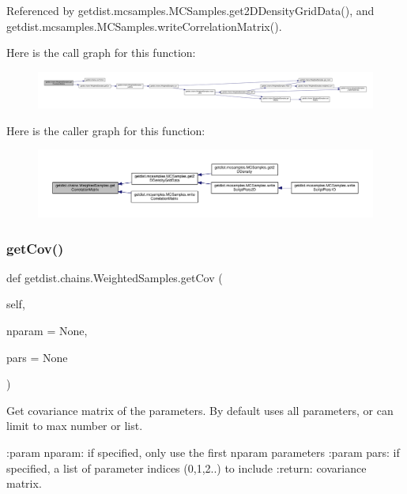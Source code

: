 Referenced by getdist.\+mcsamples.\+M\+C\+Samples.\+get2\+D\+Density\+Grid\+Data(), and getdist.\+mcsamples.\+M\+C\+Samples.\+write\+Correlation\+Matrix().

Here is the call graph for this function\+:
\nopagebreak
\begin{figure}[H]
\begin{center}
\leavevmode
\includegraphics[width=350pt]{classgetdist_1_1chains_1_1WeightedSamples_a1485368ae83e8f0586697c6080fd1025_cgraph}
\end{center}
\end{figure}
Here is the caller graph for this function\+:
\nopagebreak
\begin{figure}[H]
\begin{center}
\leavevmode
\includegraphics[width=350pt]{classgetdist_1_1chains_1_1WeightedSamples_a1485368ae83e8f0586697c6080fd1025_icgraph}
\end{center}
\end{figure}
\mbox{\label{classgetdist_1_1chains_1_1WeightedSamples_a8bdc8f5cf4d672d27a2c2d64eb2c8cc8}} 
\subsubsection{\texorpdfstring{get\+Cov()}{getCov()}}
{\footnotesize\ttfamily def getdist.\+chains.\+Weighted\+Samples.\+get\+Cov (\begin{DoxyParamCaption}\item[{}]{self,  }\item[{}]{nparam = {\ttfamily None},  }\item[{}]{pars = {\ttfamily None} }\end{DoxyParamCaption})}

\begin{DoxyVerb}Get covariance matrix of the parameters. By default uses all parameters, or can limit to max number or list.

:param nparam: if specified, only use the first nparam parameters
:param pars: if specified, a list of parameter indices (0,1,2..) to include 
:return: covariance matrix.
\end{DoxyVerb}
 

